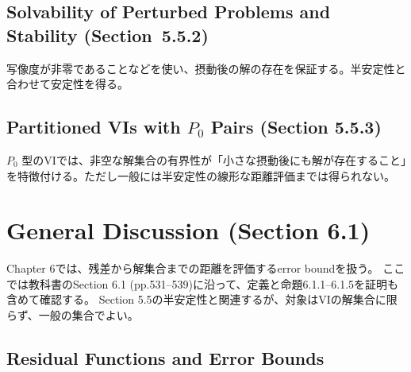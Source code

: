 \documentclass[12pt,dvipdfmx]{article}
\theoremstyle{plain}
\begin{document}
\subsection{Solvability of Perturbed Problems and Stability (Section~5.5.2)}

写像度が非零であることなどを使い、摂動後の解の存在を保証する。半安定性と合わせて安定性を得る。

\subsection{Partitioned VIs with \texorpdfstring{$P_0$}{P0} Pairs (Section 5.5.3)}


$P_0$ 型のVIでは、非空な解集合の有界性が「小さな摂動後にも解が存在すること」を特徴付ける。ただし一般には半安定性の線形な距離評価までは得られない。


\clearpage

\section{General Discussion (Section 6.1)}
\label{sec:error-general}

Chapter 6では、残差から解集合までの距離を評価するerror boundを扱う。
ここでは教科書のSection 6.1 (pp.531--539)に沿って、定義と命題6.1.1--6.1.5を証明も含めて確認する。
Section 5.5の半安定性と関連するが、対象はVIの解集合に限らず、一般の集合でよい。

\subsection{Residual Functions and Error Bounds}
\label{sec:error-residual}
\end{document}
